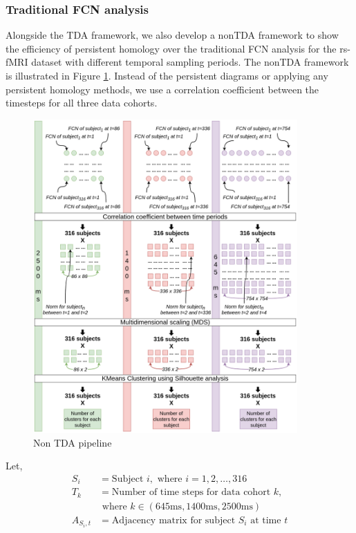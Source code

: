 \subsubsection{Traditional FCN analysis}
\label{sec:nontda_pipeline}
Alongside the TDA framework, we also develop a nonTDA framework to show the efficiency of persistent homology over the traditional FCN analysis for the rs-fMRI dataset with different temporal sampling periods. The nonTDA framework is illustrated in Figure \ref{fig:nontda_pipeline}. Instead of the persistent diagrams or applying any persistent homology methods, we use a correlation coefficient between the timesteps for all three data cohorts. 
\begin{figure}[H]%
	\centering	
	\includegraphics[width=0.9\textwidth, trim={0cm, 0.0cm, 0.0cm, 0.0cm}]{figures/non_tda_pipeline.png}
	\caption{Non TDA pipeline}
	\label{fig:nontda_pipeline}
\end{figure}

Let,
\begin{align*}
S_i &= \text{Subject } i, \text{ where } i = 1,2,\ldots,316 \\
T_k &= \text{Number of time steps for data cohort } k, \\
&\text{ where } k\in(645\text{ms}, 1400\text{ms}, 2500\text{ms}) \\
A_{S_i,t} &= \text{Adjacency matrix for subject } S_i \text{ at time } t
\end{align*}

